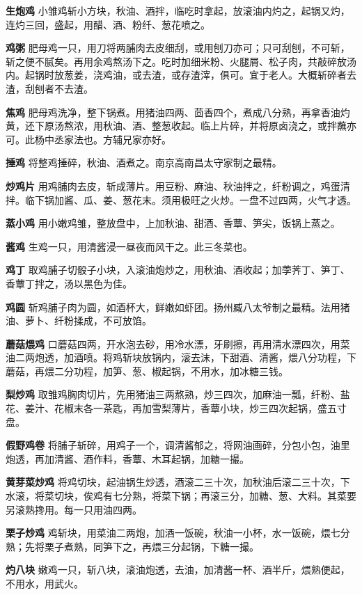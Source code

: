 \documentclass[]{article}
\begin{document}
\textbf{生炮鸡}
小雏鸡斩小方块，秋油、酒拌，临吃时拿起，放滚油内灼之，起锅又灼，连灼三回，盛起，用醋、酒、粉纤、葱花喷之。

\textbf{鸡粥}
肥母鸡一只，用刀将两脯肉去皮细刮，或用刨刀亦可；只可刮刨，不可斩，斩之便不腻矣。再用余鸡熬汤下之。吃时加细米粉、火腿屑、松子肉，共敲碎放汤内。起锅时放葱姜，浇鸡油，或去渣，或存渣滓，俱可。宜于老人。大概斩碎者去渣，刮刨者不去渣。

\textbf{焦鸡}
肥母鸡洗净，整下锅煮。用猪油四两、茴香四个，煮成八分熟，再拿香油灼黄，还下原汤熬浓，用秋油、酒、整葱收起。临上片碎，并将原卤浇之，或拌蘸亦可。此杨中丞家法也。方辅兄家亦好。

\textbf{捶鸡} 将整鸡捶碎，秋油、酒煮之。南京高南昌太守家制之最精。

\textbf{炒鸡片}
用鸡脯肉去皮，斩成薄片。用豆粉、麻油、秋油拌之，纤粉调之，鸡蛋清拌。临下锅加酱、瓜、姜、葱花末。须用极旺之火炒。一盘不过四两，火气才透。

\textbf{蒸小鸡}
用小嫩鸡雏，整放盘中，上加秋油、甜酒、香蕈、笋尖，饭锅上蒸之。

\textbf{酱鸡} 生鸡一只，用清酱浸一昼夜而风干之。此三冬菜也。

\textbf{鸡丁}
取鸡脯子切骰子小块，入滚油炮炒之，用秋油、酒收起；加荸荠丁、笋丁、香蕈丁拌之，汤以黑色为佳。

\textbf{鸡圆}
斩鸡脯子肉为圆，如酒杯大，鲜嫩如虾团。扬州臧八太爷制之最精。法用猪油、萝卜、纤粉揉成，不可放馅。

\textbf{蘑菇煨鸡}
口蘑菇四两，开水泡去砂，用冷水漂，牙刷擦，再用清水漂四次，用菜油二两炮透，加酒喷。将鸡斩块放锅内，滚去沫，下甜酒、清酱，煨八分功程，下蘑菇，再煨二分功程，加笋、葱、椒起锅，不用水，加冰糖三钱。

\textbf{梨炒鸡}
取雏鸡胸肉切片，先用猪油三两熬熟，炒三四次，加麻油一瓢，纤粉、盐花、姜汁、花椒末各一茶匙，再加雪梨薄片，香蕈小块，炒三四次起锅，盛五寸盘。

\textbf{假野鸡卷}
将脯子斩碎，用鸡子一个，调清酱郁之，将网油画碎，分包小包，油里炮透，再加清酱、酒作料，香蕈、木耳起锅，加糖一撮。

\textbf{黄芽菜炒鸡}
将鸡切块，起油锅生炒透，酒滚二三十次，加秋油后滚二三十次，下水滚，将菜切块，俟鸡有七分熟，将菜下锅；再滚三分，加糖、葱、大料。其菜要另滚熟搀用。每一只用油四两。

\textbf{栗子炒鸡}
鸡斩块，用菜油二两炮，加酒一饭碗，秋油一小杯，水一饭碗，煨七分熟；先将栗子煮熟，同笋下之，再煨三分起锅，下糖一撮。

\textbf{灼八块}
嫩鸡一只，斩八块，滚油炮透，去油，加清酱一杯、酒半斤，煨熟便起，不用水，用武火。
\end{document}
